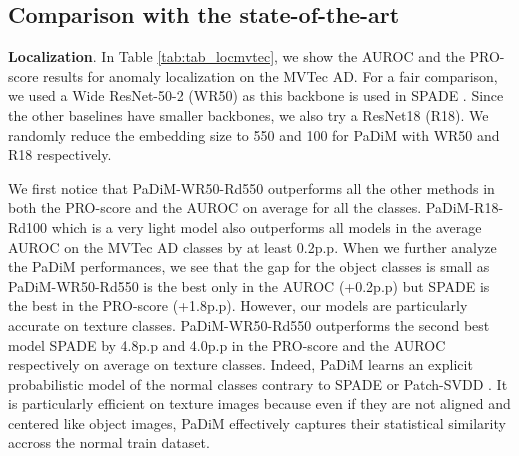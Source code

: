 \documentclass[a4paper,conference]{IEEEtran}
\begin{document}
\subsection{Comparison with the state-of-the-art}
\label{Comparison with the state-of-the-art}
\textbf{Localization}. In Table \ref{tab:tab_locmvtec}, we show the AUROC and the PRO-score results for anomaly localization on the MVTec AD. For a fair comparison, we used a Wide ResNet-50-2 (WR50) as this backbone is used in SPADE \cite{cohen2020subimage}. Since the other baselines have smaller backbones, we also try a ResNet18 (R18). We randomly reduce the embedding size to 550 and 100 for PaDiM with WR50 and R18 respectively.

We first notice that PaDiM-WR50-Rd550 outperforms all the other methods in both the PRO-score and the AUROC on average for all the classes. PaDiM-R18-Rd100 which is a very light model also outperforms all models in the average AUROC on the MVTec AD classes by at least 0.2p.p. When we further analyze the PaDiM performances, we see that the gap for the object classes is small as PaDiM-WR50-Rd550 is the best only in the AUROC (+0.2p.p) but SPADE \cite{cohen2020subimage} is the best in the PRO-score (+1.8p.p). However, our models are particularly accurate on texture classes. PaDiM-WR50-Rd550 outperforms the second best model SPADE \cite{cohen2020subimage} by 4.8p.p and 4.0p.p in the PRO-score and the AUROC respectively on average on texture classes. Indeed, PaDiM learns an explicit probabilistic model of the normal classes contrary to SPADE \cite{cohen2020subimage} or Patch-SVDD \cite{yi2020patch}. It is particularly efficient on texture images because even if  they are not aligned and centered like object images, PaDiM effectively captures their statistical similarity accross the normal train dataset. 
\end{document}
